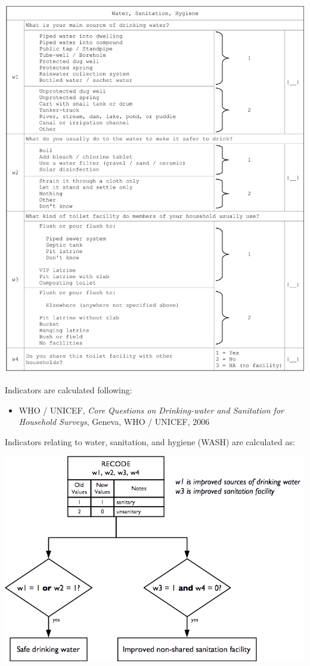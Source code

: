 \documentclass[12pt,a4paper]{book}
\providecommand{\tightlist}{%
  \setlength{\itemsep}{0pt}\setlength{\parskip}{0pt}}
\theoremstyle{definition}
\theoremstyle{definition}
\theoremstyle{definition}
\theoremstyle{remark}
\begin{document}
\begin{center}\includegraphics{figures/questionnaire10} \end{center}

\newpage

Indicators are calculated following:

\begin{itemize}
\tightlist
\item
  WHO / UNICEF, \emph{Core Questions on Drinking-water and Sanitation
  for Household Surveys}, Geneva, WHO / UNICEF, 2006
\end{itemize}

Indicators relating to water, sanitation, and hygiene (WASH) are
calculated as:

\begin{center}\includegraphics{figures/indicators24} \end{center}
\end{document}
